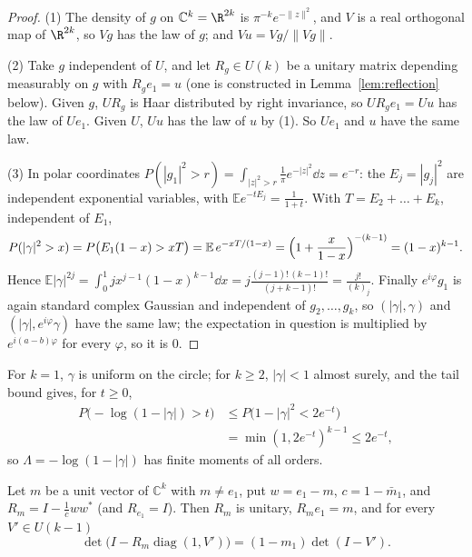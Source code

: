 \begin{proof}
(1) The density of $g$ on $\mathbb C^k=\R^{2k}$ is $\pi^{-k}e^{-\|z\|^2}$, and $V$ is a real orthogonal map of $\R^{2k}$, so $Vg$ has the law of $g$; and $Vu=Vg/\|Vg\|$.

(2) Take $g$ independent of $U$, and let $R_g\in U(k)$ be a unitary matrix depending measurably on $g$ with $R_ge_1=u$ (one is constructed in Lemma~\ref{lem:reflection} below). Given $g$, $UR_g$ is Haar distributed by right invariance, so $UR_ge_1=Uu$ has the
law of $Ue_1$. Given $U$, $Uu$ has the law of $u$ by (1). So $Ue_1$ and $u$ have the same law.

(3) In polar coordinates $P(|g_1|^2>r)=\int_{|z|^2>r}\frac1\pi e^{-|z|^2}\dd z=e^{-r}$: the $E_j=|g_j|^2$ are independent exponential variables, with $\mathbb Ee^{-tE_j}=\frac1{1+t}$. With $T=E_2+\dots+E_k$, independent of $E_1$,
\[
P(|\gamma|^2>x)=P\bigl(E_1(1-x)>xT\bigr)=\mathbb E\,e^{-xT/(1-x)}=\Bigl(1+\frac x{1-x}\Bigr)^{-(k-1)}=(1-x)^{k-1}.
\]
Hence $\mathbb E|\gamma|^{2j}=\int_0^1jx^{j-1}(1-x)^{k-1}\dd x=j\frac{(j-1)!\,(k-1)!}{(j+k-1)!}=\frac{j!}{(k)_j}$. Finally $e^{i\varphi}g_1$ is again standard complex Gaussian and independent of $g_2,\dots,g_k$, so $(|\gamma|,\gamma)$ and
$(|\gamma|,e^{i\varphi}\gamma)$ have the same law; the expectation in question is multiplied by $e^{i(a-b)\varphi}$ for every $\varphi$, so it is $0$.
\end{proof}

For $k=1$, $\gamma$ is uniform on the circle; for $k\ge2$, $|\gamma|<1$ almost surely, and the tail bound gives, for $t\ge0$,
\begin{equation}\label{eq:logtail}
\begin{split}
P\bigl(-\log(1-|\gamma|)>t\bigr)&\le P\bigl(1-|\gamma|^2<2e^{-t}\bigr)\\
&=\min(1,2e^{-t})^{k-1}\le2e^{-t},
\end{split}
\end{equation}
so $\Lambda=-\log(1-|\gamma|)$ has finite moments of all orders.

\begin{lemma}[a reflection]\label{lem:reflection}
Let $m$ be a unit vector of $\mathbb C^k$ with $m\ne e_1$, put $w=e_1-m$, $c=1-\bar m_1$, and $R_m=I-\frac1cww^*$ (and $R_{e_1}=I$). Then $R_m$ is unitary, $R_me_1=m$, and for every $V'\in U(k-1)$
\[
\det\bigl(I-R_m\operatorname{diag}(1,V')\bigr)=(1-m_1)\det(I-V').
\]
\end{lemma}


